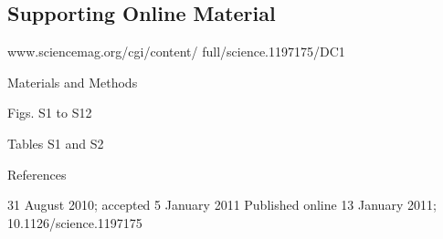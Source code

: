 \documentclass[10pt,a4paper,twoside,onecolumn]{article}
\begin{document}
\begin{myfont}
\begin{multicols}{3}
\section*{\textbf{Supporting Online Material}}
www.sciencemag.org/cgi/content/ full/science.1197175/DC1 

Materials and Methods

Figs. S1 to S12

Tables S1 and S2

References

31 August 2010; accepted 5 January 2011 Published online 13 January 2011; 10.1126/science.1197175
	
	
	
	
	
	
	
	
\end{multicols}	
\end{myfont}	
\end{document}
